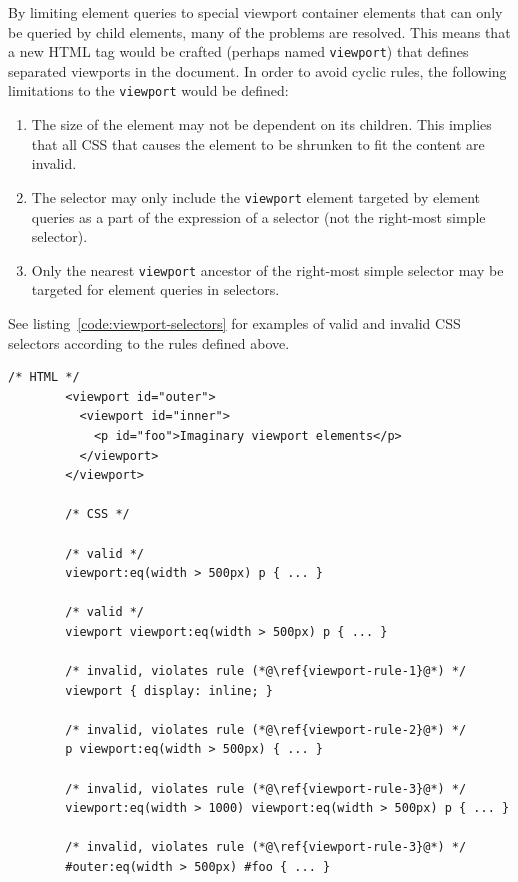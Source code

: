 \documentclass[a4paper,11pt]{kth-mag}
\newcommand{\code}[1]{\texttt{#1}}
\begin{document}
      By limiting element queries to special \gls{viewport} container \glspl{element} that can only be queried by child \glspl{element}, many of the problems are resolved.
      This means that a new \gls{HTML} tag would be crafted (perhaps named \code{viewport}) that defines separated \glspl{viewport} in the \gls{document}.
      In order to avoid cyclic rules, the following limitations to the \code{viewport} would be defined:
      \begin{enumerate}
        \item\label{viewport-rule-1} The size of the \gls{element} may not be dependent on its children. This implies that all \gls{CSS} that causes the \gls{element} to be shrunken to fit the content are invalid.
        \item\label{viewport-rule-2} The selector may only include the \code{viewport} \gls{element} targeted by element queries as a part of the expression of a selector (not the right-most simple selector).
        \item\label{viewport-rule-3} Only the nearest \code{viewport} ancestor of the right-most simple selector may be targeted for element queries in selectors.
      \end{enumerate}
      See listing~\ref{code:viewport-selectors} for examples of valid and invalid CSS selectors according to the rules defined above.
      \begin{lstlisting}[gobble=8,caption={Examples of valid and invalid selectors with the imaginary \code{viewport} element.}, captionpos=b, label={code:viewport-selectors}]
        /* HTML */
        <viewport id="outer">
          <viewport id="inner">
            <p id="foo">Imaginary viewport elements</p>
          </viewport>
        </viewport>

        /* CSS */

        /* valid */
        viewport:eq(width > 500px) p { ... }

        /* valid */
        viewport viewport:eq(width > 500px) p { ... }

        /* invalid, violates rule (*@\ref{viewport-rule-1}@*) */
        viewport { display: inline; }

        /* invalid, violates rule (*@\ref{viewport-rule-2}@*) */
        p viewport:eq(width > 500px) { ... }

        /* invalid, violates rule (*@\ref{viewport-rule-3}@*) */
        viewport:eq(width > 1000) viewport:eq(width > 500px) p { ... }

        /* invalid, violates rule (*@\ref{viewport-rule-3}@*) */
        #outer:eq(width > 500px) #foo { ... }
      \end{lstlisting}        
\end{document}
